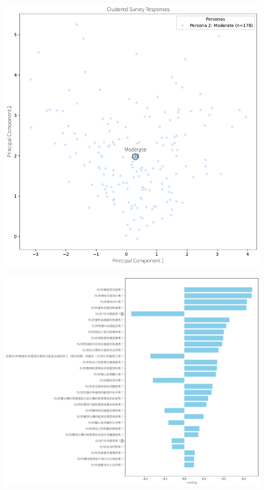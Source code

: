 \documentclass[
  letterpaper,
  DIV=11,
  numbers=noendperiod]{scrartcl}
\begin{document}
\includegraphics{_thesis_files/figure-pdf/cell-85-output-1.pdf}

\includegraphics{_thesis_files/figure-pdf/cell-85-output-2.pdf}
\end{document}
